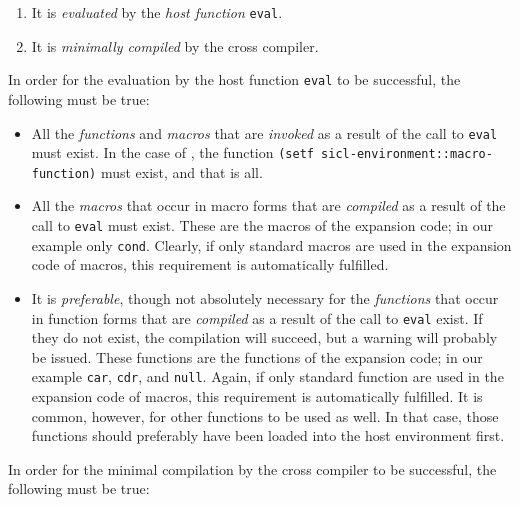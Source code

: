 \begin{enumerate}
\item It is \emph{evaluated} by the \emph{host function}
  \texttt{eval}.
\item It is \emph{minimally compiled} by the cross compiler.
\end{enumerate}

In order for the evaluation by the host function \texttt{eval} to be
successful, the following must be true:

\begin{itemize}
\item All the \emph{functions} and \emph{macros} that are
  \emph{invoked} as a result of the call to \texttt{eval} must exist.
  In the case of , the function
  \texttt{(setf sicl-environment::macro-function)} must exist, and that
    is all.
\item All the \emph{macros} that occur in macro forms that are
  \emph{compiled} as a result of the call to \texttt{eval} must
  exist.  These are the macros of the expansion code; in our example
  only \texttt{cond}.  Clearly, if only standard \commonlisp{} macros are
  used in the expansion code of macros, this requirement is
  automatically fulfilled.
\item It is \emph{preferable}, though not absolutely necessary for the
  \emph{functions} that occur in function forms that are
  \emph{compiled} as a result of the call to \texttt{eval} exist.  If
  they do not exist, the compilation will succeed, but a warning will
  probably be issued.  These functions are the functions of the
  expansion code; in our example \texttt{car}, \texttt{cdr}, and
  \texttt{null}.  Again, if only standard \commonlisp{} function are used in
  the expansion code of macros, this requirement is automatically
  fulfilled.  It is common, however, for other functions to be used as
  well.  In that case, those functions should preferably have been
  loaded into the host environment first. 
\end{itemize}

In order for the minimal compilation by the cross compiler to be
successful, the following must be true:

